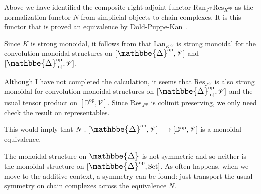 \documentclass[a4paper,12pt,reqno]{amsart}
\def\makebigger#1#2#3{\hbox{#1$\mathsurround=0pt #2{#3}$}}
\def\bigger#1#2{{\relax\mathpalette{\makebigger#1}{#2}}}
\newcommand{\DelCat}{{\bigger\large{\mathbbe{\Delta}}}}
\theoremstyle{definition}
\theoremstyle{fact}
\theoremstyle{genquest}
\theoremstyle{step}
\newcommand{\lra}{\longrightarrow}
\def\CV{{\mathscr V}}
\begin{document}
Above we have identified the composite right-adjoint functor $\mathrm{Ran}_{J^{\mathrm{op}}} \mathrm{Res}_{K^{\mathrm{op}}}$ as the normalization functor $N$
from simplicial objects to chain complexes. 
It is this functor that is proved an equivalence by Dold-Puppe-Kan~\cite{Dold, DoldPuppe, Kan}. 

Since $K$ is strong monoidal, it follows from \cite{DaySt1995} that
$\mathrm{Lan}_{K^{\mathrm{op}}}$ is strong monoidal for the convolution
monoidal structures on $[\DelCat^{\mathrm{op}},\CV]$ and  $[\DelCat_{\mathrm{inj}}^{\mathrm{op}},\CV]$.   

Although I have not completed the calculation, it seems that 
$\mathrm{Res}_{J^{\mathrm{op}}}$ is also strong monoidal for convolution
monoidal structures on $[\DelCat_{\mathrm{inj}}^{\mathrm{op}},\CV]$
and the usual tensor product on $[\mathbb{D}^{\mathrm{op}},\CV] $. 
Since $\mathrm{Res}_{J^{\mathrm{op}}}$ is colimit preserving, we
only need check the result on representables.   

This would imply that $N : [\DelCat^{\mathrm{op}},\CV]\lra [\mathbb{D}^{\mathrm{op}},\CV]$ is a monoidal equivalence. 

The monoidal structure on $\DelCat$ is not symmetric and so neither is the
monoidal structure on $[\DelCat^{\mathrm{op}},\mathrm{Set}]$.
As often happens, when we move to the additive context, a symmetry can be
found: just transport the usual symmetry on chain complexes across the equivalence $N$. 
\end{document}

